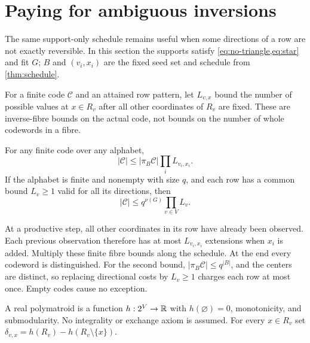 \section{Paying for ambiguous inversions}\label{sec:paid}
The same support-only schedule remains useful when some directions of a
row are not exactly reversible. In this section the supports satisfy
\cref{eq:no-triangle,eq:star} and fit $G$; $B$ and $(v_i,x_i)$ are the
fixed seed set and schedule from \cref{thm:schedule}.

For a finite code $\mathcal C$ and an attained row pattern, let
$L_{v,x}$ bound the number of possible values at $x\in R_v$ after all
other coordinates of $R_v$ are fixed. These are inverse-fibre bounds on
the actual code, not bounds on the number of whole codewords in a fibre.

\begin{theorem}\label{thm:card-cost}
For any finite code over any alphabet,
\[
 |\mathcal C|\le |\pi_B\mathcal C|\prod_i L_{v_i,x_i}.
\]
If the alphabet is finite and nonempty with size $q$, and each row has a
common bound $L_v\ge1$ valid for all its directions, then
\[
 |\mathcal C|\le q^{\nu(G)}\prod_{v\in V}L_v.
\]
\end{theorem}
\begin{outline}
At a productive step, all other coordinates in its row have already been
observed. Each previous observation therefore has at most $L_{v_i,x_i}$
extensions when $x_i$ is added. Multiply these finite fibre bounds along
the schedule. At the end every codeword is distinguished. For the second
bound, $|\pi_B\mathcal C|\le q^{|B|}$, and the centers are distinct, so
replacing directional costs by $L_v\ge1$ charges each row at most once.
Empty codes cause no exception.
\end{outline}

A real polymatroid is a function $h:2^V\to\mathbb{R}$ with $h(\varnothing)=0$,
monotonicity, and submodularity. No integrality or exchange axiom is assumed.
For every $x\in R_v$ set
$\delta_{v,x}=h(R_v)-h(R_v\setminus\{x\})$.

